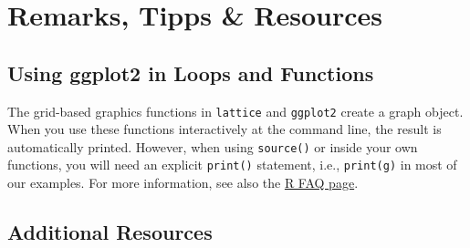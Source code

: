 \documentclass[
  letterpaper,
]{scrbook}
\begin{document}

\chapter*{Remarks, Tipps \& Resources}\label{remarks-tipps-resources}


\section*{Using ggplot2 in Loops and
Functions}\label{using-ggplot2-in-loops-and-functions}


The grid-based graphics functions in \texttt{lattice} and
\texttt{ggplot2} create a graph object. When you use these functions
interactively at the command line, the result is automatically printed.
However, when using \texttt{source()} or inside your own functions, you
will need an explicit \texttt{print()} statement, i.e.,
\texttt{print(g)} in most of our examples. For more information, see
also the
\href{https://cran.r-project.org/doc/FAQ/R-FAQ.html\#Why-do-lattice_002ftrellis-graphics-not-work_003f}{R
FAQ page}.

\section*{Additional Resources}\label{additional-resources}

\end{document}
